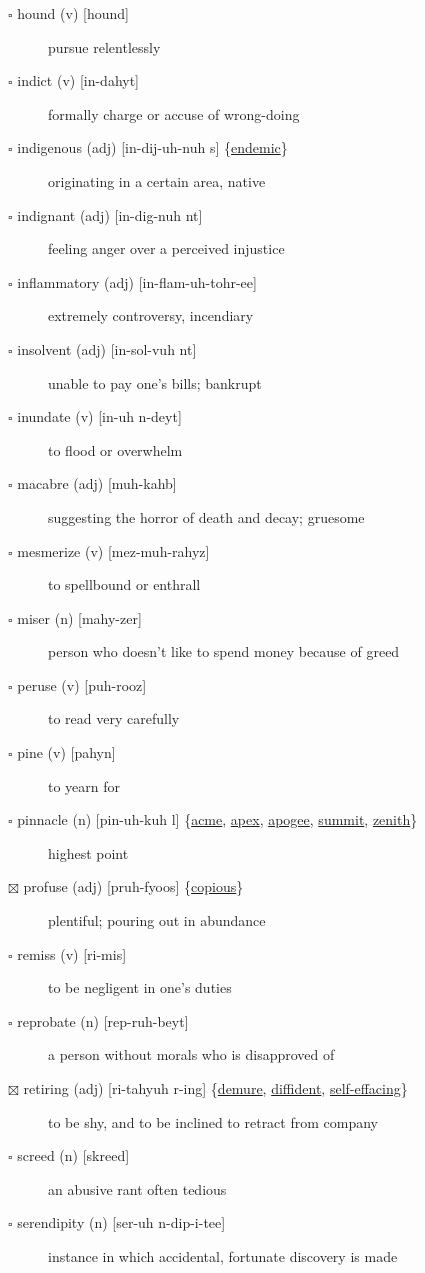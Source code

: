 \documentclass[11pt]{article}
\begin{document}
\begin{description}
\item[{$\square$ hound (v) [hound]}] pursue relentlessly
\item[{$\square$ indict (v) [in-dahyt]}] formally charge or accuse of wrong-doing
\item[{$\square$ \label{org062cbaf}indigenous (adj) [in-dij-uh-nuh s] \{\hyperref[org65cd524]{endemic}\}}] originating in a certain area, native
\item[{$\square$ indignant (adj) [in-dig-nuh nt]}] feeling anger over a perceived injustice
\item[{$\square$ inflammatory (adj) [in-flam-uh-tohr-ee]}] extremely controversy, incendiary
\item[{$\square$ insolvent (adj) [in-sol-vuh nt]}] unable to pay one's bills; bankrupt
\item[{$\square$ inundate (v) [in-uh n-deyt]}] to flood or overwhelm
\item[{$\square$ macabre (adj) [muh-kahb]}] suggesting the horror of death and decay; gruesome
\item[{$\square$ mesmerize (v) [mez-muh-rahyz]}] to spellbound or enthrall
\item[{$\square$ miser (n) [mahy-zer]}] person who doesn't like to spend money because of greed
\item[{$\square$ peruse (v) [puh-rooz]}] to read very carefully
\item[{$\square$ pine (v) [pahyn]}] to yearn for
\item[{$\square$ \label{orgc8167b5}pinnacle (n) [pin-uh-kuh l] \{\hyperref[orgcd04c21]{acme}, \hyperref[org6b46e9e]{apex}, \hyperref[orge7e78f1]{apogee}, \hyperref[org9cb55e7]{summit}, \hyperref[org79910cc]{zenith}\}}] highest point
\item[{$\boxtimes$ \label{orgfca233d}profuse (adj) [pruh-fyoos] \{\hyperref[org45be7d0]{copious}\}}] plentiful; pouring out in abundance
\item[{$\square$ remiss (v) [ri-mis]}] to be negligent in one's duties
\item[{$\square$ reprobate (n) [rep-ruh-beyt]}] a person without morals who is disapproved of
\item[{$\boxtimes$ \label{org686afa2}retiring (adj) [ri-tahyuh r-ing] \{\hyperref[orga7b7e07]{demure}, \hyperref[org76fbc15]{diffident}, \hyperref[org506513a]{self-effacing}\}}] to be shy, and to be inclined to retract from company
\item[{$\square$ screed (n) [skreed]}] an abusive rant often tedious
\item[{$\square$ serendipity (n) [ser-uh n-dip-i-tee]}] instance in which accidental, fortunate discovery is made

\end{description}
\end{document}
